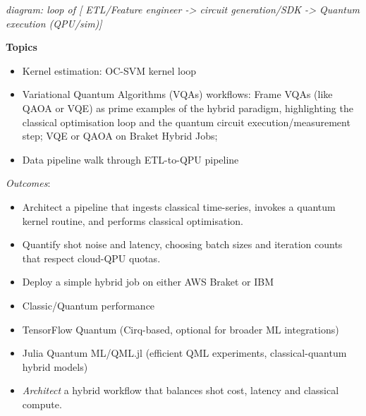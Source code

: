 \emph{diagram: loop of [ ETL/Feature engineer -> circuit generation/SDK -> Quantum execution (QPU/sim)]}

\textbf{Topics}
\begin{itemize}
	\item Kernel estimation: OC-SVM kernel loop
	\item Variational Quantum Algorithms (VQAs) workflows: 
	Frame VQAs (like QAOA or VQE) as prime examples of the hybrid paradigm, 
	highlighting the classical optimisation loop and the quantum circuit execution/measurement step; 
	VQE or QAOA on Braket Hybrid Jobs; 
	\item Data pipeline walk through ETL-to-QPU pipeline
\end{itemize}

\emph{Outcomes}:
\begin{itemize}
	\item Architect a pipeline that ingests classical time-series, invokes a quantum kernel routine, and performs classical optimisation.
	\item Quantify shot noise and latency, choosing batch sizes and iteration counts that respect cloud-QPU quotas.
	\item Deploy a simple hybrid job on either AWS Braket or IBM
	\item Classic/Quantum performance 
	\item TensorFlow Quantum (Cirq-based, optional for broader ML integrations)
	\item Julia Quantum ML/QML.jl (efficient QML experiments, classical-quantum hybrid models)
	\item \emph{Architect} a hybrid workflow that balances shot cost, latency and classical compute.
\end{itemize}